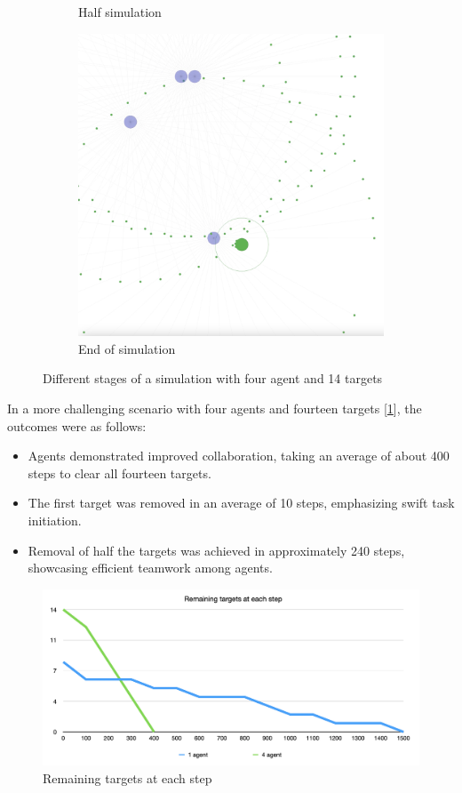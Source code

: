 \documentclass{scrartcl}
\begin{document}
\begin{figure}
\begin{subfigure}[b]{0.45\textwidth}
      \caption{Half simulation}
  \end{subfigure}
  \hfill
  \begin{subfigure}[b]{0.45\textwidth}
      \centering
      \includegraphics[width=\textwidth]{img/4_agents_3.png}
      \caption{End of simulation} 
  \end{subfigure}
  \caption{Different stages of a simulation with four agent and 14 targets}
  \label{fig:n}
\end{figure}

In a more challenging scenario with four agents and fourteen targets [\ref{fig:n}], the outcomes were as follows:
\begin{itemize}
  \item Agents demonstrated improved collaboration, taking an average of about 400 steps to clear all fourteen targets.
  \item The first target was removed in an average of 10 steps, emphasizing swift task initiation.
  \item Removal of half the targets was achieved in approximately 240 steps, showcasing efficient teamwork among agents.
\end{itemize}

\begin{figure}
\includegraphics[width=\textwidth]{img/active-targets-per-step.png}
\caption{Remaining targets at each step}
\label{fig:o}
\end{figure}
\end{document}
